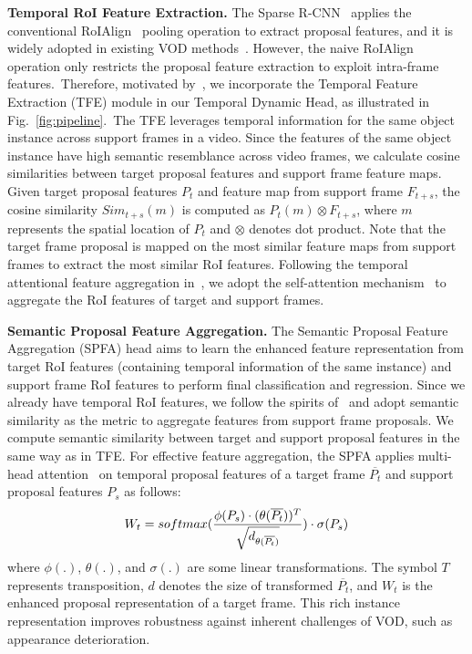 \documentclass{bmvc2k}
\begin{document}
\noindent \textbf{Temporal RoI Feature Extraction.}
\label{subsec:troi}
The Sparse R-CNN~\cite{sun2021sparse} applies the conventional RoIAlign~\cite{he2017mask} pooling operation to extract proposal features, and it is widely adopted in existing VOD methods~\cite{wu2019sequence, zhu2017flow, han2020mining}. However, the naive RoIAlign operation only restricts the proposal feature extraction to exploit intra-frame features.~Therefore, motivated by~\cite{gong2021temporal}, we incorporate the Temporal Feature Extraction (TFE) module in our Temporal Dynamic Head, as illustrated in Fig.~\ref{fig:pipeline}.~The TFE leverages temporal information for the same object instance across support frames in a video. Since the features of the same object instance have high semantic resemblance across video frames, we calculate cosine similarities between target proposal features and support frame feature maps. Given target proposal features $P_{t}$ and feature map from support frame $F_{t+s}$, the cosine similarity $Sim_{t+s}(m)$ is computed as $P_{t}(m) \otimes F_{t+s}$, where $m$ represents the spatial location of $P_{t}$ and $\otimes$ denotes dot product. Note that the target frame proposal is mapped on the most similar feature maps from support frames to extract the most similar RoI features. Following the temporal attentional feature aggregation in~\cite{gong2021temporal}, we adopt the self-attention mechanism~\cite{vaswani2017attention} to aggregate the RoI features of target and support frames.

\vspace{3pt}
\noindent \textbf{Semantic Proposal Feature Aggregation.}
\label{subsec:tfa}
The Semantic Proposal Feature Aggregation (SPFA) head aims to learn the enhanced feature representation from target RoI features (containing temporal information of the same instance) and support frame RoI features to perform final classification and regression. Since we already have temporal RoI features, we follow the spirits of~\cite{wu2019sequence} and adopt semantic similarity as the metric to aggregate features from support frame proposals. We compute semantic similarity between target and support proposal features in the same way as in TFE.
For effective feature aggregation, the SPFA applies multi-head attention~\cite{vaswani2017attention} on temporal proposal features of a target frame $\overline{P_{t}}$ and support proposal features $P_{s}$ as  follows: 
\vspace{-6pt}
\begin{equation}
\vspace{-6pt}
    W_t = softmax( \frac{ \phi(P_{s}) \cdot (\theta(\overline{P_{t}}))^T }{\sqrt{d_{\theta(\overline{P_{t}})}}})\cdot \sigma(P_{s})
\end{equation}
\noindent where $\phi(.)$, $\theta(.)$, and $\sigma(.)$ are some linear transformations. The symbol $T$ represents transposition, $d$ denotes the size of transformed $\overline{P_{t}}$, and $W_t$ is the enhanced proposal representation of a target frame. This rich instance representation improves robustness against inherent challenges of VOD, such as appearance deterioration.
\end{document}
